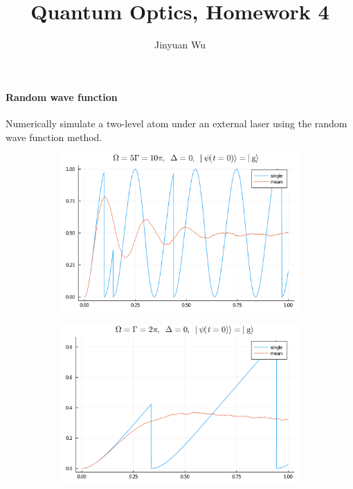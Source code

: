 \documentclass[hyperref, a4paper]{article}
\title{Quantum Optics, Homework 4}
\author{Jinyuan Wu}
\begin{document}
\maketitle

\paragraph{Random wave function} Numerically simulate a two-level atom under an external laser using the random wave
function method.

\begin{figure}
    \centering
    \begin{subfigure}{0.45\textwidth}
        \includegraphics[width=\textwidth]{rwf-1.png}
        \subcaption{}
    \end{subfigure}
    \begin{subfigure}{0.45\textwidth}
        \includegraphics[width=\textwidth]{rwf-2.png}

\end{subfigure}
\end{figure}
\end{document}
